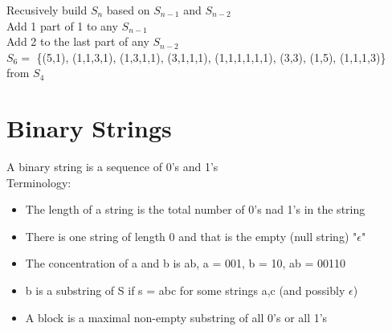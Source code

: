 \documentclass[12pt]{article}
\begin{document}
	Recusively build $S_n$ based on $S_{n-1}$ and $S_{n-2}$\\
	Add 1 part of 1 to any $S_{n-1}$\\
	Add 2 to the last part of any $S_{n-2}$\\
	
	$S_6 = $ \{(5,1), (1,1,3,1), (1,3,1,1), (3,1,1,1), (1,1,1,1,1,1), (3,3), (1,5), (1,1,1,3)\}\\
	from $S_4$\\
	
	\section*{Binary Strings}
	
	A binary string is a sequence of 0's and 1's\\
	Terminology:
	\begin{itemize}
		\item The length of a string is the total number of 0's nad 1's in the string
		\item There is one string of length 0 and that is the empty (null string) "$\epsilon$"
		\item The concentration of a and b is ab, a = 001, b = 10, ab = 00110
		\item b is a substring of S if s = abc for some strings a,c (and possibly $\epsilon$)
		\item A block is a maximal non-empty substring of all 0's or all 1's
	\end{itemize}
	
	
\end{document}
